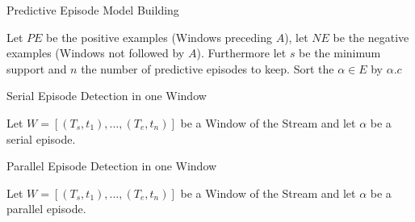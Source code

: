 \begin{algorithm}[H]
  \caption{Predictive Episode Model Building
    \label{alg_BuildPredictiveEpisodeModel}}
  \begin{algorithmic}[1]
    \Statex
    \Require Let $PE$ be the positive examples (Windows preceding $A$), let $NE$ be the negative examples (Windows not followed by $A$). Furthermore let $s$ be the minimum support and $n$ the number of predictive episodes to keep.
      \EndFor
      \State Sort the $\alpha \in E$ by  $\alpha .c$
      \State {}
    \EndFunction
  \end{algorithmic}
\end{algorithm}

\begin{algorithm}[H]
  \caption{Serial Episode Detection in one Window
    \label{alg_SerialEpisodeDetection}}
  \begin{algorithmic}[1]
    \Statex
    \Require Let $W=[(T_s,t_1),...,(T_e,t_n)]$ be a Window of the Stream and let $\alpha$ be a serial episode.
        \EndIf
      \EndWhile
      \State {}
    \EndFunction
  \end{algorithmic}
\end{algorithm}

\begin{algorithm}[H]
  \caption{Parallel Episode Detection in one Window
    \label{alg_ParallelEpisodeDetection}}
  \begin{algorithmic}[1]
    \Statex
    \Require Let $W=[(T_s,t_1),...,(T_e,t_n)]$ be a Window of the Stream and let $\alpha$ be a parallel episode.
      	\EndFor      
        \EndIf
      \EndWhile
      \State {}
    \EndFunction
  \end{algorithmic}
\end{algorithm}

